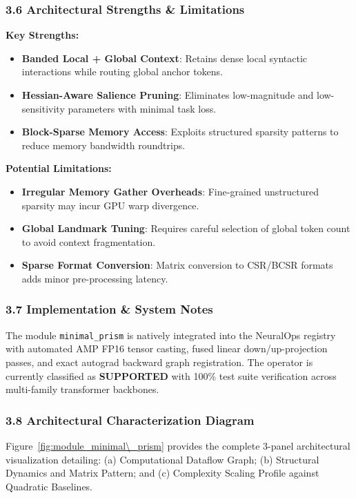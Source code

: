 \subsubsection*{3.6 Architectural Strengths \& Limitations}
\textbf{Key Strengths:}
\begin{itemize}
    \item \textbf{Banded Local + Global Context}: Retains dense local syntactic interactions while routing global anchor tokens.
    \item \textbf{Hessian-Aware Salience Pruning}: Eliminates low-magnitude and low-sensitivity parameters with minimal task loss.
    \item \textbf{Block-Sparse Memory Access}: Exploits structured sparsity patterns to reduce memory bandwidth roundtrips.
\end{itemize}

\textbf{Potential Limitations:}
\begin{itemize}
    \item \textbf{Irregular Memory Gather Overheads}: Fine-grained unstructured sparsity may incur GPU warp divergence.
    \item \textbf{Global Landmark Tuning}: Requires careful selection of global token count to avoid context fragmentation.
    \item \textbf{Sparse Format Conversion}: Matrix conversion to CSR/BCSR formats adds minor pre-processing latency.
\end{itemize}

\subsubsection*{3.7 Implementation \& System Notes}
The module \texttt{minimal\_prism} is natively integrated into the NeuralOps registry with automated AMP FP16 tensor casting, fused linear down/up-projection passes, and exact autograd backward graph registration. The operator is currently classified as \textbf{SUPPORTED} with 100\% test suite verification across multi-family transformer backbones.

\subsubsection*{3.8 Architectural Characterization Diagram}
Figure~\ref{fig:module_minimal\_prism} provides the complete 3-panel architectural visualization detailing: (a) Computational Dataflow Graph; (b) Structural Dynamics and Matrix Pattern; and (c) Complexity Scaling Profile against Quadratic Baselines.

